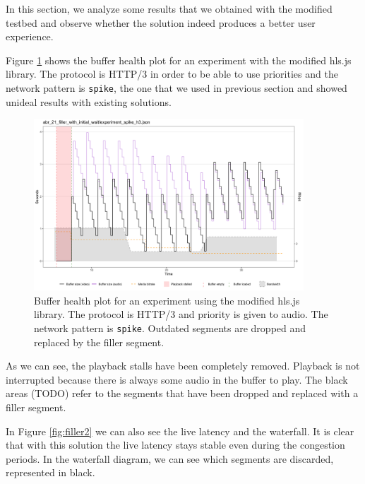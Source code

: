 In this section, we analyze some results that we obtained with the modified testbed and observe whether the solution indeed produces a better user experience.

Figure \ref{fig:filler1} shows the buffer health plot for an experiment with the modified hls.js library. The protocol is HTTP/3 in order to be able to use priorities and the network pattern is \texttt{spike}, the one that we used in previous section and showed unideal results with existing solutions.

\begin{figure}[h]
    \centering
    \includegraphics[width=0.9\textwidth]{res/impr_hls_filler.png}
    \caption{Buffer health plot for an experiment using the modified hls.js library. The protocol is HTTP/3 and priority is given to audio. The network pattern is \texttt{spike}. Outdated segments are dropped and replaced by the filler segment.}
    \label{fig:filler1}
\end{figure}

As we can see, the playback stalls have been completely removed. Playback is not interrupted because there is always some audio in the buffer to play. The black areas (TODO) refer to the segments that have been dropped and replaced with a filler segment.

In Figure \ref{fig:filler2} we can also see the live latency and the waterfall. It is clear that with this solution the live latency stays stable even during the congestion periods. In the waterfall diagram, we can see which segments are discarded, represented in black.

